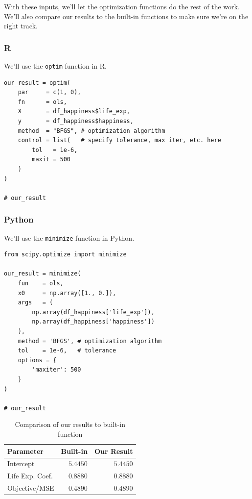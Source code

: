 \documentclass[
  letterpaper,
]{krantz}
\begin{document}
With these inputs, we'll let the optimization functions do the rest of
the work. We'll also compare our results to the built-in functions to
make sure we're on the right track.

\subsubsection{R}

We'll use the \texttt{optim} function in R.

\begin{verbatim}
our_result = optim(
    par     = c(1, 0),
    fn      = ols,
    X       = df_happiness$life_exp,
    y       = df_happiness$happiness,
    method  = "BFGS", # optimization algorithm
    control = list(   # specify tolerance, max iter, etc. here
        tol   = 1e-6,
        maxit = 500
    )  
)

# our_result
\end{verbatim}

\subsubsection{Python}

We'll use the \texttt{minimize} function in Python.

\begin{verbatim}
from scipy.optimize import minimize

our_result = minimize(
    fun    = ols,
    x0     = np.array([1., 0.]),
    args   = (
        np.array(df_happiness['life_exp']), 
        np.array(df_happiness['happiness'])
    ),
    method = 'BFGS', # optimization algorithm
    tol    = 1e-6,   # tolerance
    options = {
        'maxiter': 500
    }
)

# our_result
\end{verbatim}

\begin{longtable}{lrr}

\caption{\label{tbl-r-optim-ols}Comparison of our results to built-in
function}

\tabularnewline

\toprule
Parameter & Built-in & Our Result \\ 
\midrule\addlinespace[2.5pt]
Intercept & \textcolor[HTML]{404040}{$5.4450$} & \textcolor[HTML]{404040}{$5.4450$} \\ 
Life Exp. Coef. & \textcolor[HTML]{404040}{$0.8880$} & \textcolor[HTML]{404040}{$0.8880$} \\ 
Objective/MSE & \textcolor[HTML]{404040}{$0.4890$} & \textcolor[HTML]{404040}{$0.4890$} \\ 
\bottomrule

\end{longtable}
\end{document}

